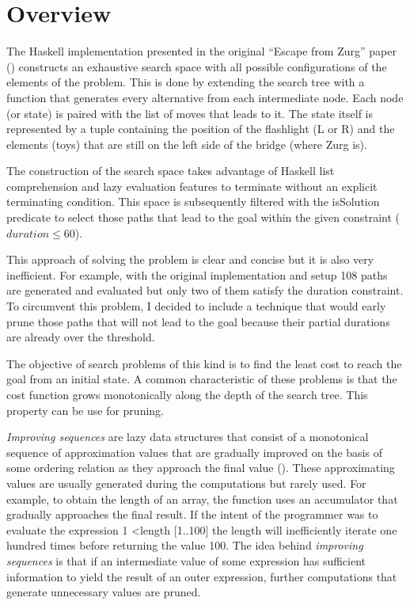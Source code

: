 \documentclass[journal,onecolumn]{IEEEtran}
\begin{document}
\section{Overview}
The Haskell implementation presented in the original ``Escape from Zurg'' paper (\cite{erwing}) constructs 
an exhaustive search space with all possible configurations of the elements of the problem.  This is done by extending the search tree with a function that generates every alternative from each intermediate node.  Each node (or state) is paired with the list of moves that leads to it. The state itself is represented by a tuple containing the position of the flashlight (\textsc{L} or \textsc{R}) and the elements (toys) that are still on the left side of the bridge (where Zurg is). 

The construction of the search space takes advantage of Haskell list comprehension and lazy evaluation features to terminate without an explicit terminating condition.  This space is subsequently filtered with the \textsf{isSolution} predicate to select those paths that lead to the goal within the given constraint (\textsc{$duration \le 60$}). 

This approach of solving the problem is clear and concise but it is also very inefficient.  For example, with the original implementation and setup 108 paths are generated and evaluated but only two of them satisfy the duration constraint. To circumvent this problem, I decided to include a technique that would early prune those paths that will not lead to the goal because their partial durations are already over the threshold. 

The objective of search problems of this kind is to find the least cost to reach the goal from an initial state.  A common characteristic of these problems is that the cost function grows monotonically along the depth of the search tree. This property can be use for pruning.

\textit{Improving sequences} are lazy data structures that consist of a monotonical sequence of approximation values that are gradually improved on the basis of some ordering relation as they approach the final value (\cite{iwasaki}). These approximating values are usually generated during the computations but rarely used.  For example, to obtain the length of an array, the function uses an accumulator that gradually approaches the final result.  If the intent of the programmer was to evaluate the expression \textsf{1 \textless length [1..100]} the \textsf{length} will inefficiently iterate one hundred times before returning the value \textsf{100}.  The idea behind \textit{improving sequences} is that if an intermediate value of some expression has sufficient information to yield the result of an outer expression, further computations that generate unnecessary values are pruned.
\end{document}
